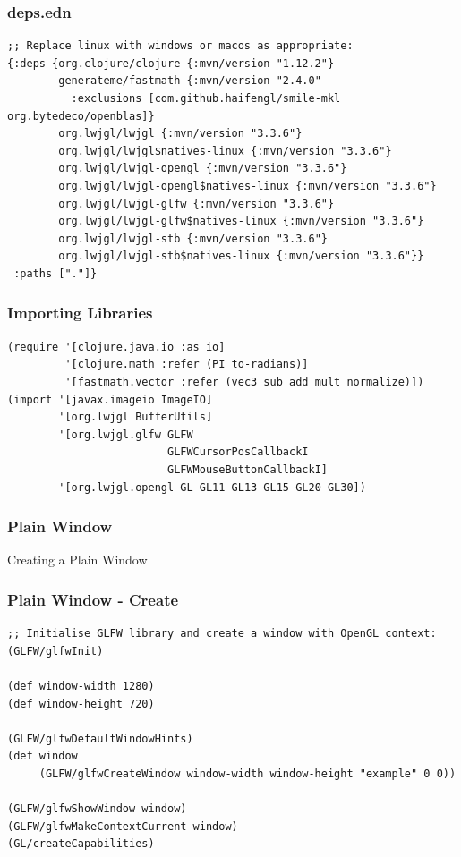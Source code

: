 \documentclass[aspectratio=169,11pt,xcolor=dvipsnames]{beamer}
\begin{document}
\begin{frame}[fragile]
  \frametitle{deps.edn}
  \begin{verbatim}
;; Replace linux with windows or macos as appropriate:
{:deps {org.clojure/clojure {:mvn/version "1.12.2"}
        generateme/fastmath {:mvn/version "2.4.0"
          :exclusions [com.github.haifengl/smile-mkl org.bytedeco/openblas]}
        org.lwjgl/lwjgl {:mvn/version "3.3.6"}
        org.lwjgl/lwjgl$natives-linux {:mvn/version "3.3.6"}
        org.lwjgl/lwjgl-opengl {:mvn/version "3.3.6"}
        org.lwjgl/lwjgl-opengl$natives-linux {:mvn/version "3.3.6"}
        org.lwjgl/lwjgl-glfw {:mvn/version "3.3.6"}
        org.lwjgl/lwjgl-glfw$natives-linux {:mvn/version "3.3.6"}
        org.lwjgl/lwjgl-stb {:mvn/version "3.3.6"}
        org.lwjgl/lwjgl-stb$natives-linux {:mvn/version "3.3.6"}}
 :paths ["."]}
  \end{verbatim}
\end{frame}

\begin{frame}[fragile]
  \frametitle{Importing Libraries}
  \begin{verbatim}
(require '[clojure.java.io :as io]
         '[clojure.math :refer (PI to-radians)]
         '[fastmath.vector :refer (vec3 sub add mult normalize)])
(import '[javax.imageio ImageIO]
        '[org.lwjgl BufferUtils]
        '[org.lwjgl.glfw GLFW
                         GLFWCursorPosCallbackI
                         GLFWMouseButtonCallbackI]
        '[org.lwjgl.opengl GL GL11 GL13 GL15 GL20 GL30])
  \end{verbatim}
\end{frame}

\begin{frame}
  \frametitle{Plain Window}
  \begin{center}
    \begin{huge}
      Creating a Plain Window
    \end{huge}
  \end{center}
\end{frame}

\begin{frame}[fragile]
  \frametitle{Plain Window {-} Create}
  \begin{verbatim}
;; Initialise GLFW library and create a window with OpenGL context:
(GLFW/glfwInit)

(def window-width 1280)
(def window-height 720)

(GLFW/glfwDefaultWindowHints)
(def window
     (GLFW/glfwCreateWindow window-width window-height "example" 0 0))

(GLFW/glfwShowWindow window)
(GLFW/glfwMakeContextCurrent window)
(GL/createCapabilities)
  \end{verbatim}
\end{frame}
\end{document}
